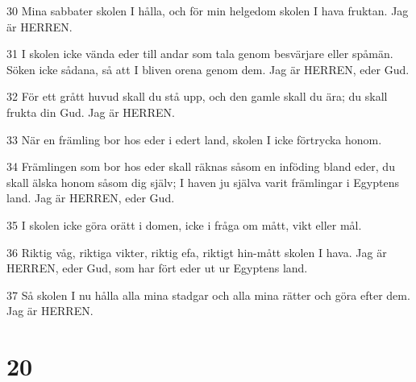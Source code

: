 \par 30 Mina sabbater skolen I hålla, och för min helgedom skolen I hava fruktan. Jag är HERREN.
\par 31 I skolen icke vända eder till andar som tala genom besvärjare eller spåmän. Söken icke sådana, så att I bliven orena genom dem. Jag är HERREN, eder Gud.
\par 32 För ett grått huvud skall du stå upp, och den gamle skall du ära; du skall frukta din Gud. Jag är HERREN.
\par 33 När en främling bor hos eder i edert land, skolen I icke förtrycka honom.
\par 34 Främlingen som bor hos eder skall räknas såsom en inföding bland eder, du skall älska honom såsom dig själv; I haven ju själva varit främlingar i Egyptens land. Jag är HERREN, eder Gud.
\par 35 I skolen icke göra orätt i domen, icke i fråga om mått, vikt eller mål.
\par 36 Riktig våg, riktiga vikter, riktig efa, riktigt hin-mått skolen I hava. Jag är HERREN, eder Gud, som har fört eder ut ur Egyptens land.
\par 37 Så skolen I nu hålla alla mina stadgar och alla mina rätter och göra efter dem. Jag är HERREN.

\chapter{20}

